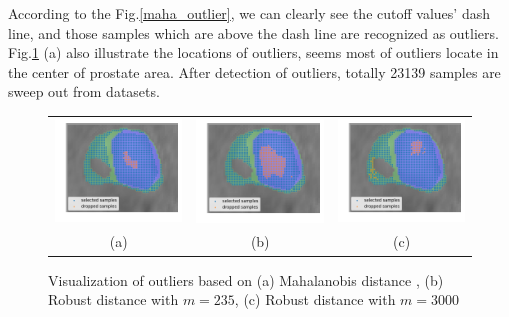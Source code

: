 \documentclass[12pt,DIV14,BCOR12mm,a4paper,footinclude=false,headinclude,parskip=half-,twoside,openright,cleardoublepage=empty,toc=index,bibliography=totoc,listof=totoc]{scrreprt}
\numberwithin{equation}{chapter}
\begin{document}
According to the Fig.\ref{maha_outlier}, we can clearly see the cutoff values' dash line, and those samples which are above the dash line are recognized as outliers. Fig.\ref{outlier_vis} (a) also illustrate the locations of outliers, seems most of outliers locate in the center of prostate area. After detection of outliers, totally 23139 samples are sweep out from datasets.


\begin{figure}
	\begin{tabular}{ccc}
		\includegraphics[scale=0.4]{image/maha_vis}&
		\includegraphics[scale=0.4]{image/rob_vis_235}&
		\includegraphics[scale=0.4]{image/robust_outlier_3000}\\
		(a)&(b)&(c)\\
	\end{tabular}	
	\caption{Visualization of outliers based on (a) Mahalanobis distance , (b) Robust distance with $m=235$, (c) Robust distance with $m=3000$}
	\label{outlier_vis}
\end{figure}
\end{document}
